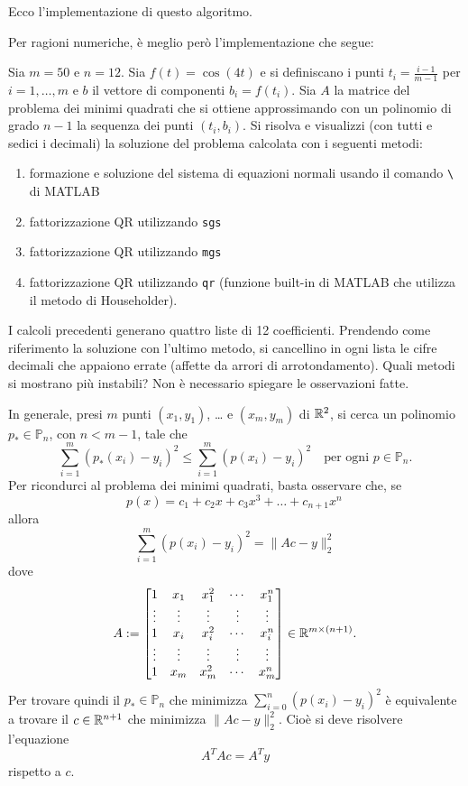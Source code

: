 Ecco l'implementazione di questo algoritmo.



Per ragioni numeriche, è meglio però l'implementazione che segue:




\begin{esercizio}
Sia \(m = 50\) e \(n = 12\). Sia \(f(t) = \cos(4t)\) e si definiscano i punti \(t_i = \frac{i-1}{m-1}\) per \(i = 1, \dots{}, m\) e \(b\) il vettore di componenti \(b_i = f(t_i)\). Sia \(A\) la matrice del problema dei minimi quadrati che si ottiene approssimando con un polinomio di grado \(n-1\) la sequenza dei punti \((t_i, b_i)\). Si risolva e visualizzi (con tutti e sedici i decimali) la soluzione del problema calcolata con i seguenti metodi:
\begin{enumerate}
\item formazione e soluzione del sistema di equazioni normali usando il comando \lstinline£\£ di MATLAB
\item fattorizzazione QR utilizzando \lstinline£sgs£
\item fattorizzazione QR utilizzando \lstinline£mgs£
\item fattorizzazione QR utilizzando \lstinline£qr£ (funzione built-in di MATLAB che utilizza il metodo di Householder).
\end{enumerate}
I calcoli precedenti generano quattro liste di 12 coefficienti. Prendendo come riferimento la soluzione con l'ultimo metodo, si cancellino in ogni lista le cifre decimali che appaiono errate (affette da arrori di arrotondamento). Quali metodi si mostrano più instabili? Non è necessario spiegare le osservazioni fatte.
\end{esercizio}

In generale, presi \(m\) punti \((x_1, y_1)\), \dots{} e \((x_m, y_m)\) di \(\mathbb R^2\), si cerca un polinomio \(p_\ast \in \mathbb P_n\), con \(n < m-1\), tale che
\[\sum_{i = 1}^m (p_\ast(x_i) - y_i)^2 \le \sum_{i = 1}^m (p(x_i) - y_i)^2 \quad \text{per ogni } p \in \mathbb P_n .\]
Per ricondurci al problema dei minimi quadrati, basta osservare che, se
\[p(x) = c_1 + c_2 x + c_3 x^3 + \dots{} + c_{n+1} x^n \,\]
allora
\[\sum_{i = 1}^m (p(x_i) - y_i)^2 = \lVert A c - y \rVert_2^2\]
dove
\[A := \begin{bmatrix}
1 & x_1 & x_1^2 & \cdots{} & x_1^n \\
\vdots{} & \vdots{} & \vdots{} & \vdots{} & \vdots{} \\
1 & x_i & x_i^2 & \cdots{} & x_i^n \\
\vdots{} & \vdots{} & \vdots{} & \vdots{} & \vdots{} \\
1 & x_m & x_m^2 & \cdots{} & x_m^n\end{bmatrix} \in \mathbb R^{m \times (n+1)} .\]
Per trovare quindi il \(p_\ast \in \mathbb P_n\) che minimizza \(\sum_{i = 0}^n (p(x_i) - y_i)^2\) è equivalente a trovare il \(c \in \mathbb R^{n+1}\) che minimizza \(\lVert Ac -y \rVert_2^2\). Cioè si deve risolvere l'equazione
\[A^T A c = A^T y\]
rispetto a \(c\).

